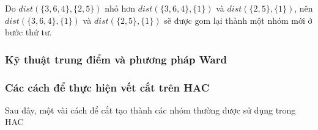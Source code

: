 Do $dist(\{3, 6, 4\}, \{2, 5\})$ nhỏ hơn $dist(\{3, 6, 4\}, \{1\})$ và $dist(\{2, 5\}, \{1\})$, nên $dist(\{3, 6, 4\}, \{1\})$ và $dist(\{2, 5\}, \{1\})$ sẽ được gom lại thành một nhóm mới ở bước thứ tư.

\subsubsection{Kỹ thuật trung điểm và phương pháp Ward}

\subsubsection{Các cách để thực hiện vết cắt trên HAC}

Sau đây, một vài cách để cắt tạo thành các nhóm thường được sử dụng trong HAC



 
